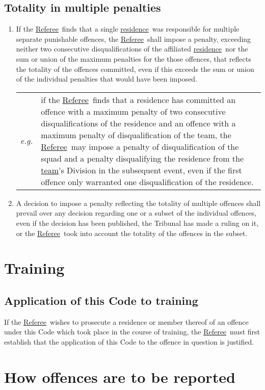 \documentclass[12pt]{report}
\newcommand{\hyplink}[1]{\hyperlink{#1}{{#1}}}
\newcommand{\eg}[1]{{\small
\begin{tabular}
  {p{0.3cm}p{11.75cm}}
  \emph{e.g.}&#1
\end{tabular}
}}
\newcommand{\Referee}{\hyplink{Referee}}
\newcommand{\residence}{\hyplink{residence}}
\newcommand{\team}{\hyplink{team}}
\begin{document}
  \section{Totality in multiple penalties}
  \begin{enumerate}
    \item If the \Referee\
       finds that a single \residence\ was responsible for multiple separate punishable offences, the \Referee\ shall impose a penalty,  exceeding neither  two consecutive disqualifications of the affiliated \residence\ nor the sum or union of the maximum penalties for the those offences, that reflects the totality of the offences committed, even if this exceeds the sum or union of the individual penalties that would have been imposed.

       \eg{if the \Referee\ finds that a residence has committed an offence with a maximum penalty of two consecutive disqualifications of the residence and an offence with a maximum penalty of disqualification of the team, the \Referee\ may impose a penalty of disqual\-ification of the squad and a penalty disqualifying the residence from the \team's Division in the subsequent event, even if the first offence only warranted one disqualification of the residence.}
    \item A decision to impose a penalty reflecting the totality of multiple offences shall prevail over any decision regarding one or a subset of the individual offences, even if the decision has been published, the Tribunal has made a ruling on it, or the \Referee\ took into account the totality of the offences in the subset.
  \end{enumerate}
  \chapter{Training}
  \section{Application of this Code to training}
  \begin{fenumerate}
    \item If the \Referee\ wishes to prosecute a residence or member thereof of an offence under this Code which took place in the course of training, the \Referee\ must first establish that the application of this Code to the offence in question is justified.
  \end{fenumerate}
  \chapter{How offences are to be reported}
\end{document}
